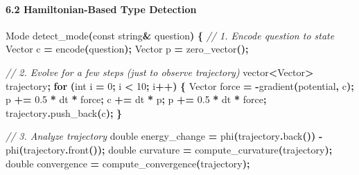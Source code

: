 \documentclass[
  11pt,
  a4paper,
]{article}
\newenvironment{Shaded}{\begin{snugshade}}{\end{snugshade}}
\newcommand{\AttributeTok}[1]{\textcolor[rgb]{0.13,0.29,0.53}{#1}}
\newcommand{\CommentTok}[1]{\textcolor[rgb]{0.56,0.35,0.01}{\textit{#1}}}
\newcommand{\ControlFlowTok}[1]{\textcolor[rgb]{0.13,0.29,0.53}{\textbf{#1}}}
\newcommand{\DataTypeTok}[1]{\textcolor[rgb]{0.13,0.29,0.53}{#1}}
\newcommand{\DecValTok}[1]{\textcolor[rgb]{0.00,0.00,0.81}{#1}}
\newcommand{\FloatTok}[1]{\textcolor[rgb]{0.00,0.00,0.81}{#1}}
\newcommand{\NormalTok}[1]{#1}
\newcommand{\OperatorTok}[1]{\textcolor[rgb]{0.81,0.36,0.00}{\textbf{#1}}}
\begin{document}
\paragraph{6.2 Hamiltonian-Based Type
Detection}\label{hamiltonian-based-type-detection-2}

\begin{Shaded}
\begin{Highlighting}[]
\NormalTok{Mode detect\_mode}\OperatorTok{(}\AttributeTok{const}\NormalTok{ string}\OperatorTok{\&}\NormalTok{ question}\OperatorTok{)} \OperatorTok{\{}
    \CommentTok{// 1. Encode question to state}
\NormalTok{    Vector c }\OperatorTok{=}\NormalTok{ encode}\OperatorTok{(}\NormalTok{question}\OperatorTok{);}
\NormalTok{    Vector p }\OperatorTok{=}\NormalTok{ zero\_vector}\OperatorTok{();}
    
    \CommentTok{// 2. Evolve for a few steps (just to observe trajectory)}
\NormalTok{    vector}\OperatorTok{\textless{}}\NormalTok{Vector}\OperatorTok{\textgreater{}}\NormalTok{ trajectory}\OperatorTok{;}
    \ControlFlowTok{for} \OperatorTok{(}\DataTypeTok{int}\NormalTok{ i }\OperatorTok{=} \DecValTok{0}\OperatorTok{;}\NormalTok{ i }\OperatorTok{\textless{}} \DecValTok{10}\OperatorTok{;}\NormalTok{ i}\OperatorTok{++)} \OperatorTok{\{}
\NormalTok{        Vector force }\OperatorTok{=} \OperatorTok{{-}}\NormalTok{gradient}\OperatorTok{(}\NormalTok{potential}\OperatorTok{,}\NormalTok{ c}\OperatorTok{);}
\NormalTok{        p }\OperatorTok{+=} \FloatTok{0.5} \OperatorTok{*}\NormalTok{ dt }\OperatorTok{*}\NormalTok{ force}\OperatorTok{;}
\NormalTok{        c }\OperatorTok{+=}\NormalTok{ dt }\OperatorTok{*}\NormalTok{ p}\OperatorTok{;}
\NormalTok{        p }\OperatorTok{+=} \FloatTok{0.5} \OperatorTok{*}\NormalTok{ dt }\OperatorTok{*}\NormalTok{ force}\OperatorTok{;}
\NormalTok{        trajectory}\OperatorTok{.}\NormalTok{push\_back}\OperatorTok{(}\NormalTok{c}\OperatorTok{);}
    \OperatorTok{\}}
    
    \CommentTok{// 3. Analyze trajectory}
    \DataTypeTok{double}\NormalTok{ energy\_change }\OperatorTok{=}\NormalTok{ phi}\OperatorTok{(}\NormalTok{trajectory}\OperatorTok{.}\NormalTok{back}\OperatorTok{())} \OperatorTok{{-}}\NormalTok{ phi}\OperatorTok{(}\NormalTok{trajectory}\OperatorTok{.}\NormalTok{front}\OperatorTok{());}
    \DataTypeTok{double}\NormalTok{ curvature }\OperatorTok{=}\NormalTok{ compute\_curvature}\OperatorTok{(}\NormalTok{trajectory}\OperatorTok{);}
    \DataTypeTok{double}\NormalTok{ convergence }\OperatorTok{=}\NormalTok{ compute\_convergence}\OperatorTok{(}\NormalTok{trajectory}\OperatorTok{);}
    

\end{Highlighting}
\end{Shaded}
\end{document}
